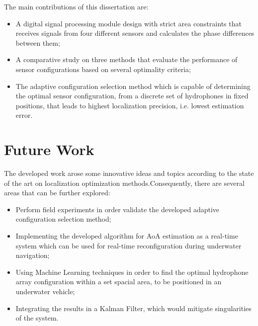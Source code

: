 The main contributions of this dissertation are: 
\begin{itemize}
	\item A digital signal processing module design with strict area constraints that receives signals from four different sensors and calculates the phase differences between them;
	
	\item A comparative study on three methods that evaluate the performance of sensor configurations based on several optimality criteria;
	
	\item The adaptive configuration selection method which is capable of determining the optimal sensor configuration, from a discrete set of hydrophones in fixed positions, that leads to highest localization precision, i.e. lowest estimation error.
\end{itemize}


\section{Future Work}

The developed work arose some innovative ideas and topics according to the state of the art on localization optimization methods.Consequently, there are several areas that can be further explored:

\begin{itemize}
	
	\item Perform field experiments in order validate the developed adaptive configuration selection method;
		
	\item Implementing the developed algorithm for AoA estimation as a real-time system which can be used for real-time reconfiguration during underwater navigation;
	
	\item Using Machine Learning techniques in order to find the optimal hydrophone array configuration within a set spacial area, to be positioned in an underwater vehicle;
	
	\item Integrating the results in a Kalman Filter, which would mitigate singularities of the system.
	
\end{itemize}